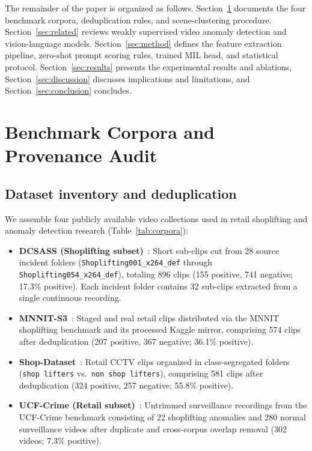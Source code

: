 \documentclass[pdflatex,sn-mathphys-num]{sn-jnl}
\begin{document}
The remainder of the paper is organized as follows. Section~\ref{sec:audit} documents the four benchmark corpora, deduplication rules, and scene-clustering procedure. Section~\ref{sec:related} reviews weakly supervised video anomaly detection and vision-language models. Section~\ref{sec:method} defines the feature extraction pipeline, zero-shot prompt scoring rules, trained MIL head, and statistical protocol. Section~\ref{sec:results} presents the experimental results and ablations, Section~\ref{sec:discussion} discusses implications and limitations, and Section~\ref{sec:conclusion} concludes.

\section{Benchmark Corpora and Provenance Audit}\label{sec:audit}

\subsection{Dataset inventory and deduplication}

We assemble four publicly available video collections used in retail shoplifting and anomaly detection research (Table~\ref{tab:corpora}):
\begin{itemize}
    \item \textbf{DCSASS (Shoplifting subset)}~\cite{dcsass}: Short sub-clips cut from 28 source incident folders (\texttt{Shoplifting001\allowbreak\_x264\allowbreak\_def} through \texttt{Shoplifting054\allowbreak\_x264\allowbreak\_def}), totaling 896 clips (155 positive, 741 negative; 17.3\% positive). Each incident folder contains 32 sub-clips extracted from a single continuous recording.
    \item \textbf{MNNIT-S3}~\cite{ansari2022esar,mnnitmendeley,mnnitkaggle}: Staged and real retail clips distributed via the MNNIT shoplifting benchmark and its processed Kaggle mirror, comprising 574 clips after deduplication (207 positive, 367 negative; 36.1\% positive).
    \item \textbf{Shop-Dataset}~\cite{shopkaggle}: Retail CCTV clips organized in class-segregated folders (\texttt{shop lifters} vs.\ \texttt{non shop lifters}), comprising 581 clips after deduplication (324 positive, 257 negative; 55.8\% positive).
    \item \textbf{UCF-Crime (Retail subset)}~\cite{sultani2018}: Untrimmed surveillance recordings from the UCF-Crime benchmark consisting of 22 shoplifting anomalies and 280 normal surveillance videos after duplicate and cross-corpus overlap removal (302 videos; 7.3\% positive).
\end{itemize}
\end{document}
